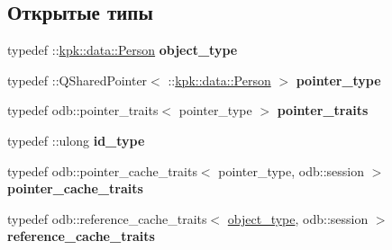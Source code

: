 \subsection*{Открытые типы}
\begin{DoxyCompactItemize}
\item 
typedef \+::\hyperlink{classkpk_1_1data_1_1_person}{kpk\+::data\+::\+Person} {\bfseries object\+\_\+type}\hypertarget{classodb_1_1access_1_1object__traits_3_01_1_1kpk_1_1data_1_1_person_01_4_a835a4404cde0b74e1e668b836c471006}{}\label{classodb_1_1access_1_1object__traits_3_01_1_1kpk_1_1data_1_1_person_01_4_a835a4404cde0b74e1e668b836c471006}

\item 
typedef \+::Q\+Shared\+Pointer$<$ \+::\hyperlink{classkpk_1_1data_1_1_person}{kpk\+::data\+::\+Person} $>$ {\bfseries pointer\+\_\+type}\hypertarget{classodb_1_1access_1_1object__traits_3_01_1_1kpk_1_1data_1_1_person_01_4_a9d2be6a5a712bf1f6bfde85dcfb8c88b}{}\label{classodb_1_1access_1_1object__traits_3_01_1_1kpk_1_1data_1_1_person_01_4_a9d2be6a5a712bf1f6bfde85dcfb8c88b}

\item 
typedef odb\+::pointer\+\_\+traits$<$ pointer\+\_\+type $>$ {\bfseries pointer\+\_\+traits}\hypertarget{classodb_1_1access_1_1object__traits_3_01_1_1kpk_1_1data_1_1_person_01_4_a58777c85d3a1d3446179b65db30fb027}{}\label{classodb_1_1access_1_1object__traits_3_01_1_1kpk_1_1data_1_1_person_01_4_a58777c85d3a1d3446179b65db30fb027}

\item 
typedef \+::ulong {\bfseries id\+\_\+type}\hypertarget{classodb_1_1access_1_1object__traits_3_01_1_1kpk_1_1data_1_1_person_01_4_ad88ee2b5a36feee6784d2e83f318f025}{}\label{classodb_1_1access_1_1object__traits_3_01_1_1kpk_1_1data_1_1_person_01_4_ad88ee2b5a36feee6784d2e83f318f025}

\item 
typedef odb\+::pointer\+\_\+cache\+\_\+traits$<$ pointer\+\_\+type, odb\+::session $>$ {\bfseries pointer\+\_\+cache\+\_\+traits}\hypertarget{classodb_1_1access_1_1object__traits_3_01_1_1kpk_1_1data_1_1_person_01_4_ac8edcdb76fea2bcb81591f7a64942b83}{}\label{classodb_1_1access_1_1object__traits_3_01_1_1kpk_1_1data_1_1_person_01_4_ac8edcdb76fea2bcb81591f7a64942b83}

\item 
typedef odb\+::reference\+\_\+cache\+\_\+traits$<$ \hyperlink{classkpk_1_1data_1_1_person}{object\+\_\+type}, odb\+::session $>$ {\bfseries reference\+\_\+cache\+\_\+traits}\hypertarget{classodb_1_1access_1_1object__traits_3_01_1_1kpk_1_1data_1_1_person_01_4_ab614bd3ff708cb0b1c0cd29118fa63ff}{}\label{classodb_1_1access_1_1object__traits_3_01_1_1kpk_1_1data_1_1_person_01_4_ab614bd3ff708cb0b1c0cd29118fa63ff}

\end{DoxyCompactItemize}
